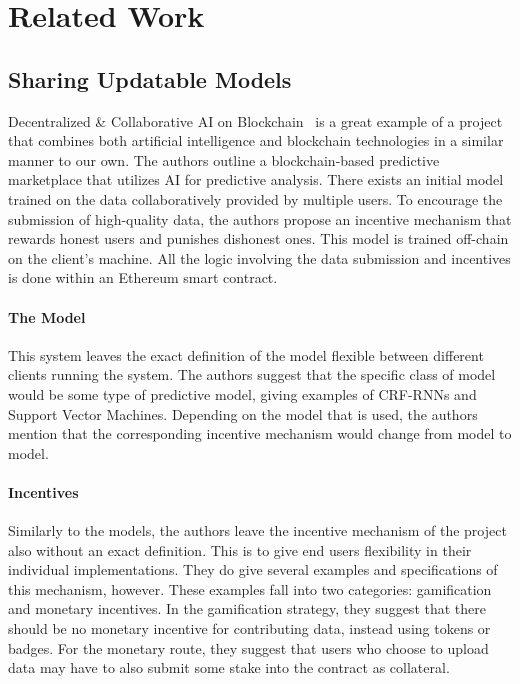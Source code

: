 \documentclass{ledger}
\begin{document}
\section{Related Work}

\subsection{Sharing Updatable Models}

Decentralized \& Collaborative AI on Blockchain~\cite{sharingModels} is a great example of a project that combines both artificial intelligence and blockchain technologies in a similar manner to our own.  The authors outline a blockchain-based predictive marketplace that utilizes AI for predictive analysis. There exists an initial model trained on the data collaboratively provided by multiple users. To encourage the submission of high-quality data, the authors propose an incentive mechanism that rewards honest users and punishes dishonest ones.  This model is trained off-chain on the client's machine.  All the logic involving the data submission and incentives is done within an Ethereum smart contract.

\paragraph{The Model}
This system leaves the exact definition of the model flexible between different clients running the system.  The authors suggest that the specific class of model would be some type of predictive model, giving examples of CRF-RNNs and Support Vector Machines.  Depending on the model that is used, the authors mention that the corresponding incentive mechanism would change from model to model.

\paragraph{Incentives}
Similarly to the models, the authors leave the incentive mechanism of the project also without an exact definition.
This is to give end users flexibility in their individual implementations.  They do give several examples and specifications of this mechanism, however.  These examples fall into two categories: gamification and monetary incentives.  In the gamification strategy, they suggest that there should be no monetary incentive for contributing data, instead using tokens or badges.  For the monetary route, they suggest that users who choose to upload data may have to also submit some stake into the contract as collateral.
\end{document}
